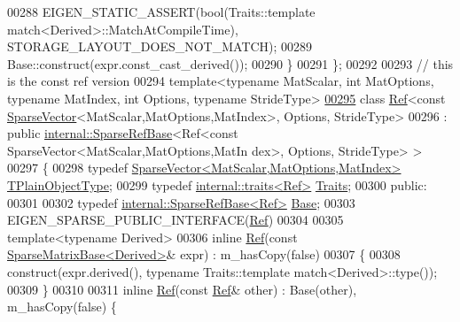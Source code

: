 \begin{DoxyCode}
00288       EIGEN\_STATIC\_ASSERT(\textcolor{keywordtype}{bool}(Traits::template match<Derived>::MatchAtCompileTime), 
      STORAGE\_LAYOUT\_DOES\_NOT\_MATCH);
00289       Base::construct(expr.const\_cast\_derived());
00290     \}
00291 \};
00292 
00293 \textcolor{comment}{// this is the const ref version}
00294 \textcolor{keyword}{template}<\textcolor{keyword}{typename} MatScalar, \textcolor{keywordtype}{int} MatOptions, \textcolor{keyword}{typename} MatIndex, \textcolor{keywordtype}{int} Options, \textcolor{keyword}{typename} Str\textcolor{keywordtype}{id}eType>
\hyperlink{class_eigen_1_1_ref_3_01const_01_sparse_vector_3_01_mat_scalar_00_01_mat_options_00_01_mat_index673660e6a13ed7a7b712b0f75a25d720}{00295} \textcolor{keyword}{class }\hyperlink{group___core___module_class_eigen_1_1_ref}{Ref}<const \hyperlink{group___sparse_core___module_class_eigen_1_1_sparse_vector}{SparseVector}<MatScalar,MatOptions,MatIndex>, Options, StrideType>
00296   : \textcolor{keyword}{public} \hyperlink{class_eigen_1_1internal_1_1_sparse_ref_base}{internal::SparseRefBase}<Ref<const SparseVector<MatScalar,MatOptions,MatIn
      dex>, Options, StrideType> >
00297 \{
00298     \textcolor{keyword}{typedef} \hyperlink{group___sparse_core___module_class_eigen_1_1_sparse_vector}{SparseVector<MatScalar,MatOptions,MatIndex>} 
      \hyperlink{group___sparse_core___module_class_eigen_1_1_sparse_vector}{TPlainObjectType};
00299     \textcolor{keyword}{typedef} \hyperlink{struct_eigen_1_1internal_1_1traits}{internal::traits<Ref>} \hyperlink{struct_eigen_1_1internal_1_1traits}{Traits};
00300   \textcolor{keyword}{public}:
00301 
00302     \textcolor{keyword}{typedef} \hyperlink{class_eigen_1_1internal_1_1_sparse_ref_base}{internal::SparseRefBase<Ref>} \hyperlink{class_eigen_1_1internal_1_1_sparse_ref_base}{Base};
00303     EIGEN\_SPARSE\_PUBLIC\_INTERFACE(\hyperlink{group___core___module_class_eigen_1_1_ref}{Ref})
00304 
00305     \textcolor{keyword}{template}<\textcolor{keyword}{typename} Derived>
00306     \textcolor{keyword}{inline} \hyperlink{group___core___module_class_eigen_1_1_ref}{Ref}(\textcolor{keyword}{const} \hyperlink{group___sparse_core___module_class_eigen_1_1_sparse_matrix_base}{SparseMatrixBase<Derived>}& expr) : m\_hasCopy(\textcolor{keyword}{false})
00307     \{
00308       construct(expr.derived(), \textcolor{keyword}{typename} Traits::template match<Derived>::type());
00309     \}
00310 
00311     \textcolor{keyword}{inline} \hyperlink{group___core___module_class_eigen_1_1_ref}{Ref}(\textcolor{keyword}{const} \hyperlink{group___core___module_class_eigen_1_1_ref}{Ref}& other) : Base(other), m\_hasCopy(\textcolor{keyword}{false}) \{

\end{DoxyCode}
